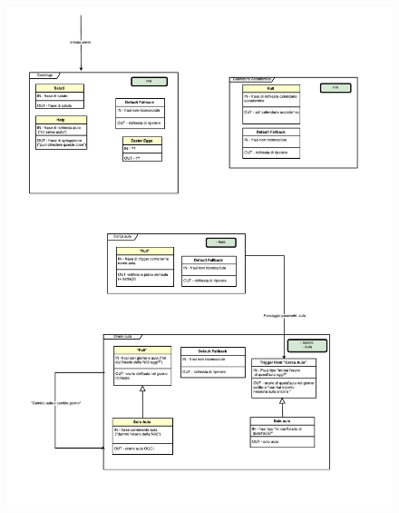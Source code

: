 \documentclass[]{article}
\begin{document}
\begin{figure}[hbtp]
\vspace*{-3cm} 
\hspace*{-3cm}
\includegraphics[width=1.6\textwidth]{p05}
\end{figure}
\end{document}
